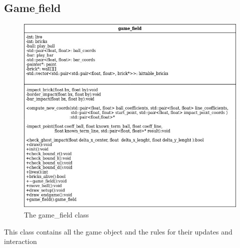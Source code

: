 \documentclass[]{article}
\begin{document}
\subsection{Game$\_$field}
\begin{figure}[h!]
    \centering
    \includegraphics[scale=0.5]{game_field.jpg}
    \caption{The game\_field class}
    \label{fig:game_field diagram }
\end{figure}
This class contains all the game object and the rules for their updates and interaction
\end{document}
